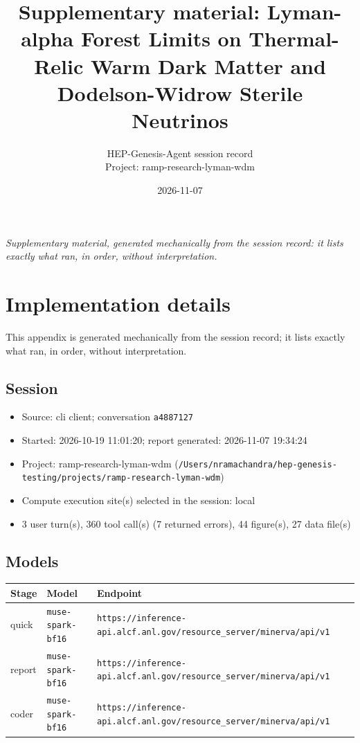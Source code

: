 \documentclass[11pt,a4paper]{article}
\title{Supplementary material: Lyman-alpha Forest Limits on Thermal-Relic Warm Dark Matter and Dodelson-Widrow Sterile Neutrinos}
\author{HEP-Genesis-Agent session record \\ \small Project: ramp-research-lyman-wdm}
\date{2026-11-07}
\begin{document}
\maketitle
\noindent\textit{\small Supplementary material, generated mechanically from the session record: it lists exactly what ran, in order, without interpretation.}
\vspace{1em}



\appendix
\section{Implementation details}
\label{app:impl}
This appendix is generated mechanically from the session record; it lists exactly what ran, in order, without interpretation.
\subsection{Session}
\begin{itemize}
  \item Source: cli client; conversation \texttt{a4887127}
  \item Started: 2026-10-19 11:01:20; report generated: 2026-11-07 19:34:24
  \item Project: ramp-research-lyman-wdm (\texttt{/\allowbreak{}Users/\allowbreak{}nramachandra/\allowbreak{}hep-genesis-testing/\allowbreak{}projects/\allowbreak{}ramp-research-lyman-wdm})
  \item Compute execution site(s) selected in the session: local
  \item 3 user turn(s), 360 tool call(s) (7 returned errors), 44 figure(s), 27 data file(s)
\end{itemize}
\subsection{Models}
\begin{longtable}{@{}p{}p{}p{}@{}}
\toprule Stage & Model & Endpoint \\ \midrule \endhead
quick & \texttt{muse-spark-bf16} & \texttt{https:\allowbreak{}/\allowbreak{}/\allowbreak{}inference-api.alcf.anl.gov/\allowbreak{}resource\_\allowbreak{}server/\allowbreak{}minerva/\allowbreak{}api/\allowbreak{}v1} \\
report & \texttt{muse-spark-bf16} & \texttt{https:\allowbreak{}/\allowbreak{}/\allowbreak{}inference-api.alcf.anl.gov/\allowbreak{}resource\_\allowbreak{}server/\allowbreak{}minerva/\allowbreak{}api/\allowbreak{}v1} \\
coder & \texttt{muse-spark-bf16} & \texttt{https:\allowbreak{}/\allowbreak{}/\allowbreak{}inference-api.alcf.anl.gov/\allowbreak{}resource\_\allowbreak{}server/\allowbreak{}minerva/\allowbreak{}api/\allowbreak{}v1} \\
\bottomrule\end{longtable}
\end{document}
